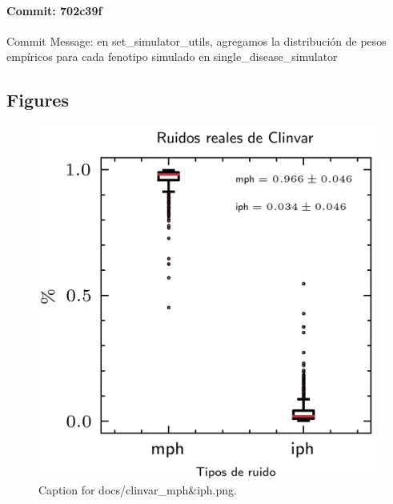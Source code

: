 \documentclass{article}
\begin{document}
\paragraph{Commit: 702c39f}
Commit Message: en set_simulator_utils, agregamos la distribución de pesos empíricos para cada fenotipo simulado en single_disease_simulator

\subsection{Figures}
\begin{figure}[h] \centering \includegraphics{docs/clinvar_mph&iph.png} \caption{Caption for docs/clinvar_mph&iph.png.} \end{figure}
\end{document}
